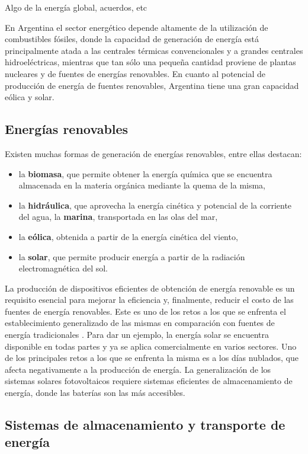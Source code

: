 Algo de la energía global, acuerdos, etc

En Argentina el sector energético depende altamente de la utilización de 
combustibles fósiles, donde la capacidad de generación de energía está 
principalmente atada a las centrales térmicas convencionales y a grandes 
centrales hidroeléctricas, mientras que tan sólo una pequeña cantidad proviene 
de plantas nucleares y de fuentes de energías renovables. En cuanto al potencial
de producción de energía de fuentes renovables, Argentina tiene una gran 
capacidad eólica y solar. 

\subsection{Energías renovables}

Existen muchas formas de generación de energías renovables, entre ellas destacan:
\begin{itemize}
    \item la \textbf{biomasa}, que permite obtener la energía química 
        que se encuentra almacenada en la materia orgánica mediante la quema de 
        la misma,
    \item la \textbf{hidráulica}, que aprovecha la energía cinética y potencial
        de la corriente del agua, la \textbf{marina}, transportada en las olas
        del mar,
    \item la \textbf{eólica}, obtenida a partir de la energía cinética del viento,
    \item la \textbf{solar}, que permite producir energía a partir de la radiación
        electromagnética del sol.
\end{itemize}
La producción de dispositivos eficientes de obtención de energía renovable es un 
requisito esencial para mejorar la eficiencia y, finalmente, reducir el costo de 
las fuentes de energía renovables. Este es uno de los retos a los que se 
enfrenta el establecimiento generalizado de las mismas en comparación con fuentes
de energía tradicionales \cite{olabi2022}. Para dar un ejemplo, la energía solar 
se encuentra disponible en todas partes y ya se aplica comercialmente en varios 
sectores. Uno de los principales retos a los que se enfrenta la misma es a los 
días nublados, que afecta negativamente a la producción de energía. La 
generalización de los sistemas solares fotovoltaicos requiere sistemas eficientes 
de almacenamiento de energía, donde las baterías son las más accesibles. 

\subsection{Sistemas de almacenamiento y transporte de energía}

